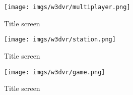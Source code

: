 \begin{figure}[H]
  \centering
 \texttt{[image: imgs/w3dvr/multiplayer.png]}
 \caption{Title screen}
\end{figure}

\begin{figure}[H]
  \centering
 \texttt{[image: imgs/w3dvr/station.png]}
 \caption{Title screen}
\end{figure}

\begin{figure}[H]
  \centering
 \texttt{[image: imgs/w3dvr/game.png]}
 \caption{Title screen}
\end{figure}


